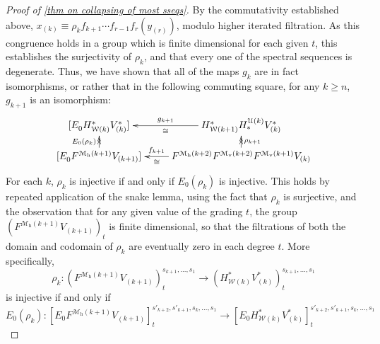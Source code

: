 \documentclass[11pt]{amsart} \renewcommand{\baselinestretch}{1.2}
\theoremstyle{plain}
\theoremstyle{definition}
\renewcommand{\to}{\longrightarrow}
\newcommand{\calU}{\mathcal{U}}
\newcommand{\calw}{\mathcal{W}}
\newcommand{\calMv}{\mathcal{M}\dver}
\newcommand{\calMh}{\mathcal{M}\dhor}
\newcommand{\UEAX}{\bar{X}'}%
\newcommand{\E}[5]{[E^{#1}_{#2}#3]^{#4}_{#5}}
\newcommand{\dver}{_\mathrm{v}}
\newcommand{\dhor}{_\mathrm{h}}
\begin{document}
\begin{Calculations of HWn}
\begin{proof}[Proof of \ref{thm on collapsing of most sseqs}]
By the commutativity established above, $x_{(k)}\equiv\rho_{k}f_{k+1}\cdots f_{r-1}f_r(y_{(r)})$, modulo higher iterated filtration. As this congruence holds in a group which is finite dimensional for each given $t$, this establishes the surjectivity of $\rho_k$, and that
%
%
%
every one of the spectral sequences is degenerate. Thus, we have shown that all of the maps $g_k$ are in fact isomorphisms, or rather that in the following commuting square, for any $k\geq n$,  $g_{k+1}$ is an isomorphism:
\[\xymatrix@R=4mm{
\E{}{0}{H^*_{\calw(k)}V^*_{(k)}}{}{}
&H^*_{\calw(k+1)}H_*^{\calU(k)}V^*_{(k)}\ar@{->}[l]^-{\cong}_-{{g}_{k+1}}
\\
\E{}{0}{F^{\calMh(k+1)}V_{(k+1)}}{}{}\ar@{->>}[u]^-{E_0(\rho_k)}
&F^{\calMh(k+2)}F^{\calMv(k+2)}F^{\calMv(k+1)}V_{(k)}\ar@{->}[l]^-{\cong}_-{{f}_{k+1}}\ar@{->>}[u]_-{\rho_{k+1}}
}\]
For each $k$, $\rho_k$ is injective if and only if $E_0(\rho_k)$ is injective. This holds by repeated application of the snake lemma, using the fact that $\rho_k$ is surjective, and the observation that for any given value of the grading $t$, the group $(F^{\calMh(k+1)}V_{(k+1)})_t$ is finite dimensional, so that the filtrations of both the domain and codomain of $\rho_k$ are eventually zero in each degree $t$. More specifically,
\[\rho_k:(F^{\calMh(k+1)}V_{(k+1)})_t^{s_{k+1},\ldots,s_1}\to (H^*_{\calw(k)}V^*_{(k)})_t^{s_{k+1},\ldots,s_1}\]
is injective if and only if
\[E_0(\rho_k):
\E{}{0}{F^{\calMh(k+1)}V_{(k+1)}}{s'_{k+2},s'_{k+1},s_k,\ldots,s_1}{t}
\to \E{}{0}{H^*_{\calw(k)}V^*_{(k)}}{s'_{k+2},s'_{k+1},s_k,\ldots,s_1}{t}\]

\end{proof}
\end{Calculations of HWn}
\end{document}
